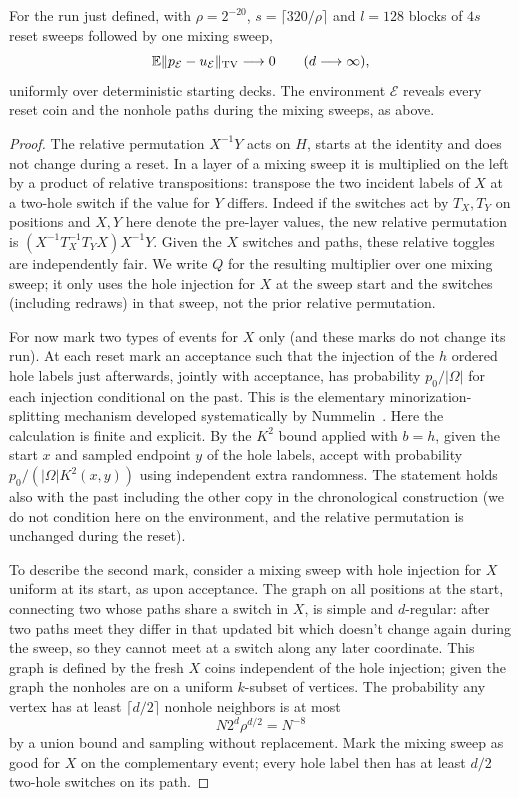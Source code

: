 \begin{proposition}\label{prop:reset-conditional}
For the run just defined, with $\rho=2^{-20}$, $s=\lceil320/\rho\rceil$ and $l=128$ blocks of $4s$ reset sweeps followed by one mixing sweep,
\[
 \mathbb E\|p_{\mathcal E}-u_{\mathcal E}\|_{\rm TV}\longrightarrow0
 \qquad(d\longrightarrow\infty),
\]
uniformly over deterministic starting decks. The environment $\mathcal E$ reveals every reset coin and the nonhole paths during the mixing sweeps, as above.
\end{proposition}
\begin{proof}
The relative permutation \(X^{-1}Y\) acts on \(H\), starts at the identity and does not change during a reset. In a layer of a mixing sweep it is multiplied on the left by a product of relative transpositions: transpose the two incident labels of \(X\) at a two-hole switch if the value for \(Y\) differs. Indeed if the switches act by \(T_X,T_Y\) on positions and \(X,Y\) here denote the pre-layer values, the new relative permutation is \((X^{-1}T_X^{-1}T_Y X)X^{-1}Y\). Given the \(X\) switches and paths, these relative toggles are independently fair. We write \(Q\) for the resulting multiplier over one mixing sweep; it only uses the hole injection for \(X\) at the sweep start and the switches (including redraws) in that sweep, not the prior relative permutation.

For now mark two types of events for \(X\) only (and these marks do not change its run). At each reset mark an acceptance such that the injection of the \(h\) ordered hole labels just afterwards, jointly with acceptance, has probability \(p_0/|\Omega|\) for each injection conditional on the past. This is the elementary minorization-splitting mechanism developed systematically by Nummelin~\cite[Section~2]{nummelin1978}. Here the calculation is finite and explicit. By the \(K^2\) bound applied with \(b=h\), given the start \(x\) and sampled endpoint \(y\) of the hole labels, accept with probability \(p_0/(|\Omega|K^2(x,y))\) using independent extra randomness. The statement holds also with the past including the other copy in the chronological construction (we do not condition here on the environment, and the relative permutation is unchanged during the reset).

To describe the second mark, consider a mixing sweep with hole injection for \(X\) uniform at its start, as upon acceptance. The graph on all positions at the start, connecting two whose paths share a switch in \(X\), is simple and \(d\)-regular: after two paths meet they differ in that updated bit which doesn't change again during the sweep, so they cannot meet at a switch along any later coordinate. This graph is defined by the fresh \(X\) coins independent of the hole injection; given the graph the nonholes are on a uniform \(k\)-subset of vertices. The probability any vertex has at least \(\lceil d/2\rceil\) nonhole neighbors is at most
\[
N2^d\rho^{d/2}=N^{-8}
\]
by a union bound and sampling without replacement. Mark the mixing sweep as good for \(X\) on the complementary event; every hole label then has at least \(d/2\) two-hole switches on its path.


\end{proof}
